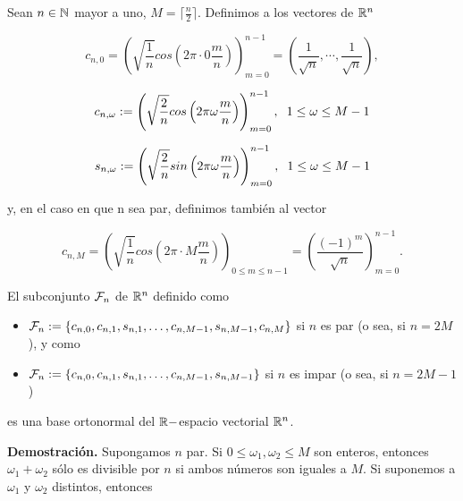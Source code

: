 \begin{prop}
\label{prop: base de fourier version real}
Sean $n \in \mathbb{N}$ mayor a uno, $M = \lceil \frac{n}{2} \rceil$.
Definimos a los vectores de $\mathbb{R}^{n}$

\[
c_{n, 0}= \left( \sqrt{\frac{1}{n}} cos
	\left(2 \pi \cdot 0 \frac{m}{n}
	\right) \right)_{m=0}^{n-1} = 
	\left( \frac{1}{\sqrt{n}}, \cdots, \frac{1}{\sqrt{n}} \right),
\]

	\begin{equation}
	\label{eq0: 10ab}
	c_{n, \omega} := \left( \sqrt{\frac{2}{n}} cos
	\left(2 \pi \omega \frac{m}{n}
	\right) \right)_{m=0}^{n-1},
	\hspace{0.2cm} 1 \leq \omega \leq M-1
	\end{equation}
	
	\begin{equation}
	\label{eq0: 4May}
	s_{n, \omega} := \left( \sqrt{\frac{2}{n}} sin
	\left(2 \pi \omega \frac{m}{n}
	\right) \right)_{m=0}^{n-1},
	\hspace{0.2cm} 1 \leq \omega \leq M-1
	\end{equation}
	
y, en el caso en que n sea par, definimos también
al vector

	\[
c_{n, M}= \left( \sqrt{\frac{1}{n}} cos
	\left(2 \pi \cdot M \frac{m}{n}
	\right) \right)_{0 \leq m \leq n-1} = 
	\left( \frac{(-1)^{m}}{\sqrt{n}} \right)_{m=0}^{n-1}.
\]

El subconjunto $\mathcal{F}_{n}$ de $\mathbb{R}^{n}$ definido como

	\begin{itemize}
	\item $\mathcal{F}_{n} : = \{ c_{n,0}, c_{n,1}, s_{n,1},
	\ldots , c_{n,M-1}, s_{n,M-1}, c_{n,M} \}$ si $n$ es par
	(o sea, si $n=2M$), y como
	\item $\mathcal{F}_{n} : = \{ c_{n,0}, c_{n,1}, s_{n,1},
	\ldots , c_{n,M-1}, s_{n,M-1} \}$ si $n$ es impar
	(o sea, si $n=2M-1$)
	\end{itemize}
	
es una base ortonormal del $\mathbb{R}-$espacio vectorial $\mathbb{R}^{n}$.
\end{prop}

\noindent
\textbf{Demostración.}
Supongamos $n$ par. Si $0 \leq \omega_{1}, \omega_{2} \leq M$
son enteros, entonces
$\omega_{1} + \omega_{2}$ sólo es divisible por $n$ si ambos números
son iguales a $M$. Si suponemos a $\omega_{1}$ y $\omega_{2}$ distintos, 
entonces

